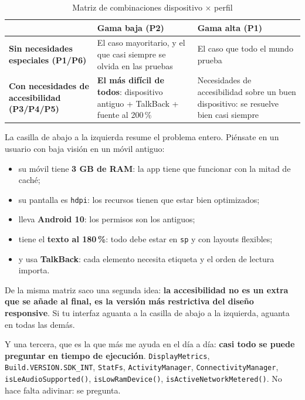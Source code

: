 \documentclass[11pt,a4paper]{article}
\newcommand{\code}[1]{\texttt{\color{navylight}#1}}
\begin{document}
	\begin{table}[htbp]
		\centering
		\begin{tabularx}{\textwidth}{@{}>{\RaggedRight\arraybackslash}p{3.3cm} >{\RaggedRight\arraybackslash}X >{\RaggedRight\arraybackslash}X@{}}
			\toprule
			\rowcolor{primary}
			\textcolor{paper}{\sffamily\bfseries} & \textcolor{paper}{\sffamily\bfseries Gama baja (P2)} & \textcolor{paper}{\sffamily\bfseries Gama alta (P1)} \\
			\midrule
			\textbf{Sin necesidades especiales (P1/P6)} & El caso mayoritario, y el que casi siempre se olvida en las pruebas & El caso que todo el mundo prueba \\
			\rowcolor{soft}
			\textbf{Con necesidades de accesibilidad (P3/P4/P5)} & \textbf{El más difícil de todos}: dispositivo antiguo + TalkBack + fuente al 200\,\% & Necesidades de accesibilidad sobre un buen dispositivo: se resuelve bien casi siempre \\
			\bottomrule
		\end{tabularx}
		\caption{Matriz de combinaciones dispositivo $\times$ perfil}
	\end{table}
	
	La casilla de abajo a la izquierda resume el problema entero. Piénsate en un usuario con baja visión en un móvil antiguo:
	\begin{itemize}[leftmargin=*,itemsep=0.15em]
		\item su móvil tiene \textbf{3 GB de RAM}: la app tiene que funcionar con la mitad de caché;
		\item su pantalla es \code{hdpi}: los recursos tienen que estar bien optimizados;
		\item lleva \textbf{Android 10}: los permisos son los antiguos;
		\item tiene el \textbf{texto al 180\,\%}: todo debe estar en \code{sp} y con layouts flexibles;
		\item y usa \textbf{TalkBack}: cada elemento necesita etiqueta y el orden de lectura importa.
	\end{itemize}
	
	De la misma matriz saco una segunda idea: \textbf{la accesibilidad no es un extra que se añade al final, es la versión más restrictiva del diseño responsive}. Si tu interfaz aguanta a la casilla de abajo a la izquierda, aguanta en todas las demás.
	
	Y una tercera, que es la que más me ayuda en el día a día: \textbf{casi todo se puede preguntar en tiempo de ejecución}. \code{DisplayMetrics}, \code{Build.VERSION.SDK\_INT}, \code{StatFs}, \code{ActivityManager}, \code{ConnectivityManager}, \code{isLeAudioSupported()}, \code{isLowRamDevice()}, \code{isActiveNetworkMetered()}. No hace falta adivinar: se pregunta.
	
\end{document}
